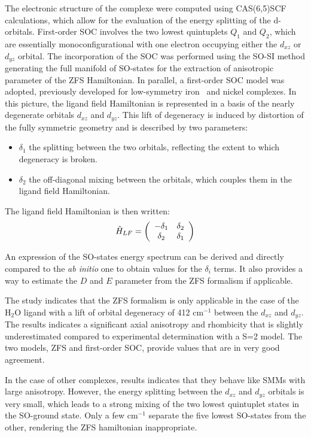 \documentclass[12pt]{report}
\numberwithin{equation}{section}
\begin{document}
The electronic structure of the complexe were computed using CAS(6,5)SCF calculations, which allow for the evaluation of the energy splitting of the d-orbitals.
First-order SOC involves the two lowest quintuplets $Q_1$ and $Q_2$, which are essentially monoconfigurational with one electron occupying either the $d_{xz}$ or $d_{yz}$ orbital.
The incorporation of the SOC was performed using the SO-SI method generating the full manifold of SO-states for the extraction of anisotropic parameter of the ZFS Hamiltonian.
In parallel, a first-order SOC model was adopted, previously developed for low-symmetry iron~\cite{atanasov_detailed_2011} and nickel complexes.
In this picture, the ligand field Hamiltonian is represented in a basis of the nearly degenerate orbitals $d_{xz}$ and $d_{yz}$.
This lift of degeneracy is induced by distortion of the fully symmetric geometry and is described by two parameters:

\begin{itemize}
    \item $\delta_1$ the splitting between the two orbitals, reflecting the extent to which degeneracy is broken.
    \item $\delta_2$ the off-diagonal mixing between the orbitals, which couples them in the ligand field Hamiltonian.
\end{itemize}

The ligand field Hamiltonian is then written:
\[ \hat{H}_{LF}= \left( \begin{array}{c c}
    -\delta_1 & \delta_2 \\
    \delta_2& \delta_1
    \end{array} \right)
\]

An expression of the SO-states energy spectrum can be derived and directly compared to the \textit{ab initio} one to obtain values for the $\delta_i$ terms.
It also provides a way to estimate the $D$ and $E$ parameter from the ZFS formalism if applicable.


The study indicates that the ZFS formalism is only applicable in the case of the H$_2$O ligand with a lift of orbital degeneracy of 412 cm$^{-1}$ between the $d_{xz}$ and $d_{yz}$.
The results indicates a significant axial anisotropy and rhombicity that is slightly underestimated compared to experimental determination with a S=2 model.
The two models, ZFS and first-order SOC, provide values that are in very good agreement.

In the case of other complexes, results indicates that they behave like SMMs with large anisotropy.
However, the energy splitting between the $d_{xz}$ and $d_{yz}$ orbitals is very small, which leads to a strong mixing of the two lowest quintuplet states in the SO-ground state.
Only a few cm$^{-1}$ separate the five lowest SO-states from the other, rendering the ZFS hamiltonian inappropriate.
\end{document}

